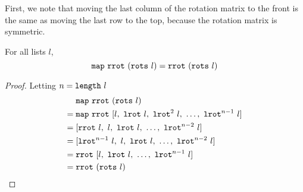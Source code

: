\documentclass[sigplan,10pt,anonymous,review]{thesis}
\begin{document}
First, we note that moving the last column of the rotation matrix to the front
is the same as moving the last row to the top, because the rotation
matrix is symmetric.
\begin{theorem}
  For all lists $l$,
  \begin{equation*}
    \texttt{\textup{map}}~\texttt{\textup{rrot}}~(\texttt{\textup{rots}}~l) = \texttt{\textup{rrot}}~(\texttt{\textup{rots}}~l)
  \end{equation*}
\end{theorem}
\begin{proof}
  Letting $n = \texttt{\textup{length}}~l$
  \begin{align*}
       &\texttt{\textup{map}}~\texttt{\textup{rrot}}~(\texttt{\textup{rots}}~l) \\
    ={}&\texttt{\textup{map}}~\texttt{\textup{rrot}}~[l,~\texttt{\textup{lrot}}~l,~\texttt{\textup{lrot}}^2~l,~\ldots,~\texttt{\textup{lrot}}^{n-1}~l] \\
    ={}&[\texttt{\textup{rrot}}~l,~l,~\texttt{\textup{lrot}}~l,~\ldots,~\texttt{\textup{lrot}}^{n-2}~l] \\
    ={}&[\texttt{\textup{lrot}}^{n-1}~l,~l,~\texttt{\textup{lrot}}~l,~\ldots,~\texttt{\textup{lrot}}^{n-2}~l] \\
    ={}&\texttt{\textup{rrot}}~[l,~\texttt{\textup{lrot}}~l,~\ldots,~\texttt{\textup{lrot}}^{n-1}~l] \\
    ={}&\texttt{\textup{rrot}}~(\texttt{\textup{rots}}~l) \qedhere
  \end{align*}
\end{proof}
\end{document}
